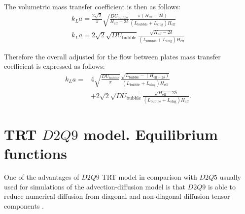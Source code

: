 \documentclass{article}
\begin{document}
\begin{description}
\begin{equation}
\end{equation}
The volumetric mass transfer coefficient is then as follows:
\begin{equation}
\begin{aligned}
k_L a=\frac{2\sqrt{2}}{\pi}\sqrt{\frac{D
U_{\mathrm{bubble}}}{H_{\mathrm{eff}}-2\delta}} \frac{\pi
(H_{\mathrm{eff}}-2\delta)}{(L_{\mathrm{bubble}}+L_{\mathrm{slug}}) H_{\mathrm{eff}}}\\
k_L a=2\sqrt{2}\sqrt{D
U_{\mathrm{bubble}}}\frac{\sqrt{H_{\mathrm{eff}}-2\delta}}{(L_{\mathrm{bubble}}+L_{\mathrm{slug}})H_
{\mathrm{eff}}}
\end{aligned}
\end{equation}

\end{description}
Therefore the overall adjusted for the flow between plates mass transfer coefficient is expressed as
follows:
\begin{equation}
\begin{aligned}
k_L a =&4 \sqrt{\frac{D U_{\mathrm{bubble}}}{\pi}}
\frac{\sqrt{L_{\mathrm{bubble}}-(H_{\mathrm{eff}-2\delta})}}{(L_{\mathrm{bubble}}+L_{\mathrm{slug}}
)H_ { \mathrm { eff } } }\\
&+2\sqrt{2}\sqrt{D
U_{\mathrm{bubble}}}\frac{\sqrt{H_{\mathrm{eff}}-2\delta}}{(L_{\mathrm{bubble}}+L_{\mathrm{slug}})H_
{\mathrm{eff}}}.
\end{aligned}
\end{equation}
 

\section{TRT $D2Q9$ model. Equilibrium functions}
One of the advantages of $D2Q9$ TRT model in comparison with $D2Q5$ usually used for simulations of
the advection-diffusion model is that $D2Q9$ is able to reduce numerical diffusion from diagonal
and non-diagonal diffusion tensor components \cite{kuzmin-stability-optimal}.
\end{document}
